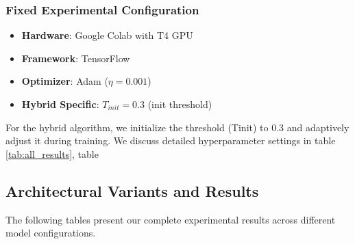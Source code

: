\subsubsection{Fixed Experimental Configuration}
\begin{itemize}
	\item \textbf{Hardware}: Google Colab with T4 GPU
	\item \textbf{Framework}: TensorFlow
	\item \textbf{Optimizer}: Adam ($\eta=0.001$)
	\item \textbf{Hybrid Specific}: $T_{init}=0.3$ (init threshold)
     
\end{itemize}
For the hybrid algorithm, we initialize the threshold (Tinit) to 0.3 and adaptively adjust it during training. We discuss detailed hyperparameter settings in table \ref{tab:all_results}, table
\subsection{Architectural Variants and Results}

The following tables present our complete experimental results across different model configurations. 
\begin{table}[h]
	\centering
	
	\caption{Performance Across Configurations}
	\label{tab:all_results}
\end{table}

